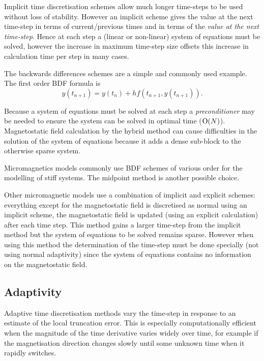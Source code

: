 Implicit time discretisation schemes allow much longer time-steps to be used without loss of stability. However an implicit scheme gives the value at the next time-step in terms of current/previous times and in terms of the \emph{value at the next time-step}. Hence at each step a (linear or non-linear) system of equations must be solved, however the increase in maximum time-step size offsets this increase in calculation time per step in many cases.

The backwards differences schemes are a simple and commonly used example. The first order BDF formula is
\begin{equation}
  \label{eq:48}
  y(t_{n+1}) = y(t_n) + hf(t_{n+1}, y(t_{n+1})).
\end{equation}

Because a system of equations must be solved at each step a \emph{preconditioner} may be needed to ensure the system can be solved in optimal time (\ie $\text{O}(N)$). Magnetostatic field calculation by the hybrid method can cause difficulties in the solution of the system of equations because it adds a dense sub-block to the otherwise sparse system.

Micromagnetics models commonly use BDF schemes of various order\cite{Suess2002} for the modelling of stiff systems. The midpoint method is another possible choice.\cite{DAquino2005}

Other micromagnetic models use a combination of implicit and explicit schemes: everything except for the magnetostatic field is discretised as normal using an implicit scheme, the magnetostatic field is updated (using an explicit calculation) after each time step. This method gains a larger time-step from the implicit method but the system of equations to be solved remains sparse. However when using this method the determination of the time-step must be done specially (\ie not using normal adaptivity) since the system of equations contains no information on the magnetostatic field.\cite{Schrefl1997}

\subsection{Adaptivity}
\label{sec:adaptivity}

Adaptive time discretisation methods vary the time-step in response to an estimate of the local truncation error. This is especially computationally efficient when the magnitude of the time derivative varies widely over time, for example if the magnetisation direction changes slowly until some unknown time when it rapidly switches.

